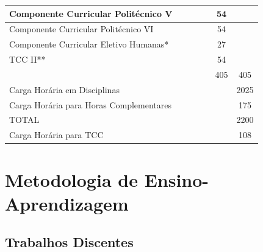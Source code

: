 \documentclass[11pt,fleqn]{book} %
\begin{document}
\begin{table}[]
{\begin{tabular}{@{}|l|c|c|c|c|c|c|@{}}
			Componente Curricular Politécnico V                           &                      &                      &                      &                      & 54                   &             \\ \midrule
			Componente Curricular Politécnico VI                          &                      &                      &                      &                      & 54                   &             \\ \midrule
			Componente Curricular Eletivo Humanas*                        &                      &                      &                      &                      & 27                   &             \\ \midrule
			TCC II**                                                      &                      &                      &                      &                      & 54                   &             \\ \midrule
			&                      &                      &                      &                      & 405                  & 405         \\ \midrule
			Carga Horária em Disciplinas                                  &                      &                      &                      &                      &                      & 2025        \\ \midrule
			Carga Horária para Horas Complementares                       &                      &                      &                      &                      &                      & 175         \\ \midrule
			TOTAL                                                         &                      &                      &                      &                      &                      & 2200        \\ \midrule
			Carga Horária para TCC                                        &                      &                      &                      &                      &                      & 108         \\ \bottomrule
		\end{tabular}%
	}
\end{table}


\section{Metodologia de Ensino-Aprendizagem}\label{metodologia}


\subsection{Trabalhos Discentes}\label{trabdiscentes}
\end{document}
